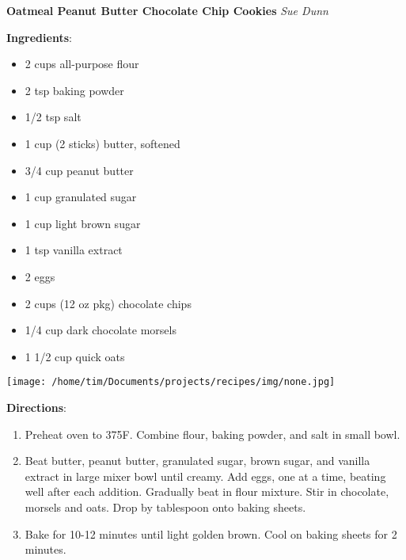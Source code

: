 \documentclass[11pt, twoside, openany]{book}
\begin{document}
\noindent\begin{minipage}[t]{\linewidth}%
{\Large\textbf{Oatmeal Peanut Butter Chocolate Chip Cookies}} \label{oatmeal-peanut-butter-chocolate-chip-cookies}\hfill\textit{Sue Dunn}\\
\noindent\begin{minipage}[t]{0.78\linewidth}%
\textbf{Ingredients}:\vspace{-3mm}
\begin{multicols}{2}
\begin{itemize}\setlength\itemsep{-1mm}
\item 2 cups all-purpose flour
\item 2 tsp baking powder
\item 1/2 tsp salt
\item 1 cup (2 sticks) butter, softened
\item 3/4 cup peanut butter
\item 1 cup granulated sugar
\item 1 cup light brown sugar
\item 1 tsp vanilla extract
\item 2 eggs
\item 2 cups (12 oz pkg) chocolate chips
\item 1/4 cup dark chocolate morsels
\item 1 1/2 cup quick oats
\end{itemize}
\end{multicols}
\end{minipage}
\noindent\begin{minipage}[t]{0.18\linewidth}
\centering \strut\vspace*{-\baselineskip}\newline
\texttt{[image: /home/tim/Documents/projects/recipes/img/none.jpg]}\\
\end{minipage}\vspace{3mm}
\textbf{Directions}:
\vspace{-3mm}\begin{enumerate}\setlength\itemsep{-1mm}
\item Preheat oven to 375F. Combine flour, baking powder, and salt in small bowl.
\item Beat butter, peanut butter, granulated sugar, brown sugar, and vanilla extract in large mixer bowl until creamy. Add eggs, one at a time, beating well after each addition. Gradually beat in flour mixture. Stir in chocolate, morsels and oats. Drop by tablespoon onto baking sheets.
\item Bake for 10-12 minutes until light golden brown. Cool on baking sheets for 2 minutes.
\end{enumerate}
\end{minipage}\vspace{8mm}
\end{document}
